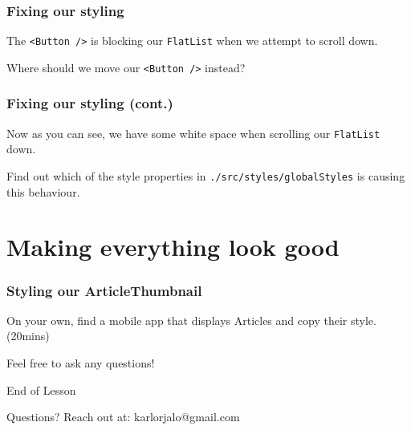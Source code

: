 \documentclass{beamer}
\begin{document}
  \begin{frame}[fragile]
    \frametitle{Fixing our styling}
    The \verb|<Button />| is blocking our \verb|FlatList| when we attempt to scroll down. 

    Where should we move our \verb|<Button />| instead? 
  \end{frame}
  \begin{frame}[fragile]
    \frametitle{Fixing our styling (cont.)}
    Now as you can see, we have some white space when scrolling our \verb|FlatList| down. 

    Find out which of the style properties in \verb|./src/styles/globalStyles| is causing this behaviour. 
  \end{frame}

  \section{Making everything look good}
  \begin{frame}[fragile]
    \frametitle{Styling our ArticleThumbnail}
    On your own, find a mobile app that displays Articles and copy their style. (20mins)

    Feel free to ask any questions!
  \end{frame}

  \appendix

  \begin{frame}[standout]
    End of Lesson

    {\small Questions? Reach out at:}
    {\footnotesize karlorjalo@gmail.com}
  \end{frame}
\end{document}

